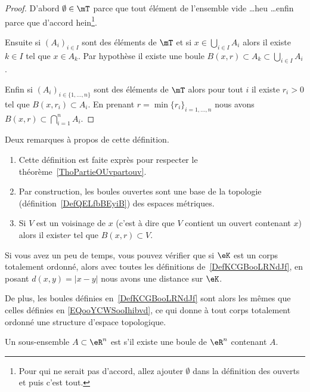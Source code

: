 \begin{proof}
    D'abord \( \emptyset\in\mT\) parce que tout élément de l'ensemble vide \ldots heu \ldots enfin parce que d'accord hein\footnote{Pour qui ne serait pas d'accord, allez ajouter \( \emptyset\) dans la définition des ouverts et puis c'est tout.}.

    Ensuite si \( (A_i)_{i\in I}\) sont des éléments de \( \mT\) et si \( x\in\bigcup_{i\in I}A_i\) alors il existe \( k\in I\) tel que \( x\in A_k\). Par hypothèse il existe une boule \( B(x,r)\subset A_k\subset\bigcup_{i\in I}A_i\).

    Enfin si \( (A_i)_{i\in\{ 1,\ldots, n \}}\) sont des éléments de \( \mT\) alors pour tout \( i\) il existe \( r_i>0\) tel que \( B(x,r_i)\subset A_i\). En prenant \( r=\min\{ r_i \}_{i=1,\ldots, n}\) nous avons $B(x,r)\subset\bigcap_{i=1}^nA_i.$
\end{proof}

\begin{remark}  \label{RemQDRooKnwKk}
    Deux remarques à propos de cette définition.
    \begin{enumerate}
        \item
    Cette définition est faite exprès pour respecter le théorème~\ref{ThoPartieOUvpartouv}.
\item
    Par construction, les boules ouvertes sont une base de la topologie (définition~\ref{DefQELfbBEyiB}) des espaces métriques.
\item       \label{ITEMooUIHJooXAFaJa}
    Si \( V\) est un voisinage de \( x\) (c'est à dire que \( V\) contient un ouvert contenant \( x\)) alors il existe\( r\) tel que \( B(x,r)\subset V\).
    \end{enumerate}
\end{remark}

\begin{normaltext}
    Si vous avez un peu de temps, vous pouvez vérifier que si \( \eK\) est un corps totalement ordonné, alors avec toutes les définitions de~\ref{DefKCGBooLRNdJf}, en posant \( d(x,y)=| x-y |\) nous avons une distance sur \( \eK\).

    De plus, les boules définies en~\ref{DefKCGBooLRNdJf} sont alors les mêmes que celles définies en \eqref{EQooYCWSooIhibvd}, ce qui donne à tout corps totalement ordonné une structure d'espace topologique.
\end{normaltext}

\begin{definition}
  Un sous-ensemble $A \subset \eR^n$ est  s'il existe une boule de $\eR^n$ contenant $A$.
\end{definition}

